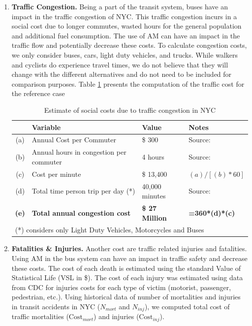 \documentclass[11pt, letterpaper]{article}
\begin{document}
\begin{enumerate}[leftmargin=*]
  
\item \textbf{Traffic Congestion.}
  Being a part of the transit system, buses have an impact in the traffic congestion
  of NYC. This traffic congestion incurs in a social cost due to longer commutes, wasted hours for 
  the general population and additional fuel consumption. The use of AM can 
  have an impact in the traffic flow and potentially decrease these costs. To calculate 
  congestion costs, we only consider buses, cars, light duty vehicles, and trucks.  While walkers and
  cyclists do experience travel times, we do not believe that they
  will change with the different alternatives and do not need to be
  included for comparison purposes. Table \ref{tab:cong.cost} presents the computation of the 
  traffic cost for the reference case

\begin{table}[h]
\caption{Estimate of social costs due to traffic congestion in NYC}
\centering
\small
\renewcommand{\arraystretch}{1.1}
\begin{tabular}{c l l l}
\hline
 	& Variable 							& Value 				& Notes 						\\\hline\hline
(a)	& Annual Cost per Commuter				& \$ 300				& Source:						\\
(b)	& Annual hours in congestion per commuter	& 4 hours				& Source:			\\
(c)	& Cost per minute 						& \$ 13,400			& $(a)/[(b)*60]$		\\
(d)	& Total time person trip per day (*)			& 40,000 minutes		& Source: 						\\
\textbf{(e)}	& \textbf{Total annual congestion cost}	& \textbf{\$ 27 Million}	& \textbf{=360*(d)*(c)}			\\\hline\hline
\multicolumn{4}{l}{{\footnotesize (*) considers only Light Duty Vehicles, Motorcycles and Buses}}
\end{tabular}
\label{tab:cong.cost}
\end{table}%


\item \textbf{Fatalities \& Injuries.}  Another cost are traffic related injuries and fatalities. 
  Using AM in the bus system can have an impact in traffic safety and decrease these costs.
  The cost of each death is estimated using the standard Value of Statistical Life (VSL in \$). The 
  cost of each injury was estimated using data from CDC for injuries costs for each type of victim 
  (motorist, passenger, pedestrian, etc.). Using historical data of number of mortalities and injuries in 
  transit accidents in NYC ($N_{mort}$ and $N_{inj}$), we computed total cost of traffic mortalities 
  ($\mbox{Cost}_{mort}$) and injuries ($\mbox{Cost}_{inj}$).


\end{enumerate}
\end{document}
